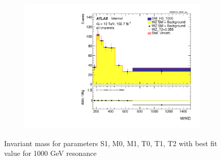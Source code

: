 \documentclass[../Bachelorarbeit.tex]{subfiles}
\begin{document}
\begin{figure}[h]
\begin{subfigure}{0.35\textwidth}
    \end{subfigure}
    \begin{subfigure}{0.35\textwidth}
        \includegraphics[width=\textwidth]{Plots/ALL_MWZ_right_color/GM_H5_1000/T2/2022-05-07/VBSSR/all_VV_MWZ_vbs.pdf}
    \end{subfigure}

    \caption{Invariant mass for parameters S1, M0, M1, T0, T1, T2 with best fit value for 1000 GeV resonance}
    \label{fig:all_mwz_1000}
\end{figure}
\end{document}
